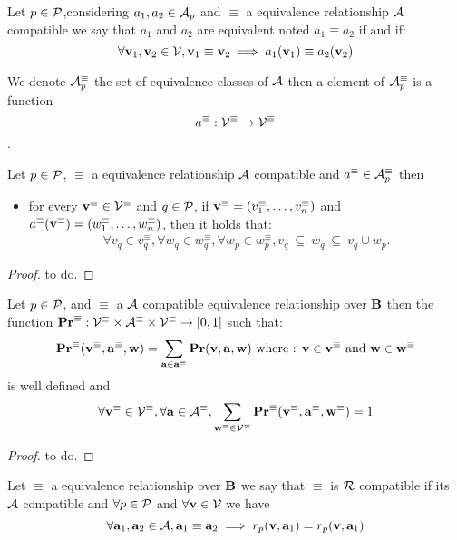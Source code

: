\begin{mydef}
	Let $p \in \mathcal{P}$,considering $a_1, a_2 \in \mathcal{A}_p$ and $\equiv$ a equivalence relationship $\mathcal{A}$ compatible we say that $a_1$ and $a_2$ are equivalent noted $a_1 \equiv a_2$ if and if:
	$$\forall \mathbf{v}_1,\mathbf{v}_2 \in \mathcal{V}, \mathbf{v}_1 \equiv \mathbf{v}_2 \implies a_1(\mathbf{v}_1) \equiv a_2(\mathbf{v}_2)$$
\end{mydef}
We denote $\mathcal{A}^\equiv_p$ the set of equivalence classes of $\mathcal{A}$ then a element of $\mathcal{A}^\equiv_p$ is a function $$a^\equiv : \mathcal{V}^\equiv \rightarrow \mathcal{V}^\equiv$$.

\begin{myprop}
	Let $p \in \mathcal{P}$, $\equiv$ a equivalence relationship $\mathcal{A}$ compatible and $a^\equiv \in \mathcal{A}^\equiv_p $ then
	\begin{itemize}
		\item for every $\mathbf{v}^\equiv \in \mathcal{V}^\equiv$ and $q \in \mathcal{P}$, if $\mathbf{v}^\equiv = (v_1^\equiv, \ldots, v_n^\equiv)$ and $a^\equiv(\mathbf{v}^\equiv) = (w_1^\equiv, \ldots, w_n^\equiv)$, then it holds that:
		\begin{eqnarray*}
			\forall v_q \in v_q ^\equiv,\forall w_q \in w_q ^\equiv,\forall w_p \in w_p ^\equiv,  v_q \ \subseteq \ w_q \ \subseteq \ v_q \cup w_p.
		\end{eqnarray*}
	\end{itemize}
\end{myprop}

\begin{proof}
	to do.
\end{proof}


\begin{myprop}
	Let $p \in \mathcal{P}$, and $\equiv$ a $\mathcal{A}$ compatible equivalence relationship over $\text{\bf B}$
	then the function $\mathbf{Pr}^\equiv : \mathcal{V}^\equiv \times \mathcal{A}^\equiv \times \mathcal{V}^\equiv \rightarrow [0,1]$ such that: 
	$$\mathbf{Pr}^\equiv(\mathbf{v}^\equiv,\mathbf{a}^\equiv,\mathbf{w}) = \sum_{\mathbf{a} \in \mathbf{a}^\equiv}\mathbf{Pr}(\mathbf{v},\mathbf{a},\mathbf{w}) \mbox{ where : } \mathbf{v}\in \mathbf{v}^\equiv \mbox{ and } \mathbf{w} \in \mathbf{w}^\equiv$$ 
	is well defined and 
	$$\forall \mathbf{v}^\equiv \in \mathcal{V}^\equiv,\forall \mathbf{a} \in \mathcal{A}^\equiv, \sum_{\mathbf{w} ^\equiv \in \mathcal{V}^\equiv} \mathbf{Pr}^\equiv(\mathbf{v}^\equiv, \mathbf{a}^\equiv, \mathbf{w}^\equiv)  =  1 $$
\end{myprop}
\begin{proof}
	to do.
\end{proof}

\begin{mydef}
	Let $\equiv$ a equivalence relationship over $\text{\bf B}$ we say that $\equiv$ is $\mathcal{R}$ compatible if its $\mathcal{A}$ compatible and $\forall p \in \mathcal{P}$ and $\forall \mathbf{v} \in \mathcal{V}$ we have 
	$$\forall \mathbf{a}_1,\mathbf{a}_2 \in \mathcal{A}, \mathbf{a}_1 \equiv \mathbf{a}_2 \implies r_p(\mathbf{v},\mathbf{a}_1) = r_p(\mathbf{v},\mathbf{a}_1)$$
\end{mydef}

